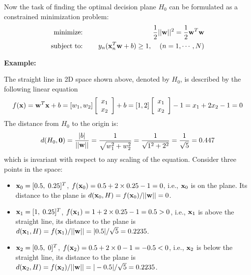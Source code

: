 \documentclass{article}
\begin{document}
Now the task of finding the optimal decision plane $H_0$ can be 
formulated as a constrained minimization problem:
\begin{eqnarray}
  \mbox{minimize:       } \;\;\;& &
  \frac{1}{2}||{\bf w}||^2 =\frac{1}{2}{\bf w}^T {\bf w}  \nonumber \\
  \mbox{subject to:     } \;\;\; & & 
  y_n ({\bf x}_n^T {\bf w}+b) \ge 1,\;\;\;\;(n=1,\cdots,N)
  \label{SVMprimal}
\end{eqnarray}


{\bf Example:}


The straight line in 2D space shown above, denoted by $H_0$, 
is described by the following linear equation 
\begin{equation}
  f({\bf x})={\bf w}^T{\bf x}+b=[w_1,w_2]
  \left[ \begin{array}{c} x_1 \\ x_2 \end{array} \right]+b
  =[1, 2]\left[ \begin{array}{c} x_1 \\ x_2 \end{array} \right]-1
  =x_1+2x_2-1=0 
\end{equation}
The distance from $H_0$ to the origin is:
\begin{equation}
  d(H_0,{\bf 0})=\frac{|b|}{||{\bf w}||}=\frac{1}{\sqrt{w_1^2+w_2^2}}
  =\frac{1}{\sqrt{1^2+2^2}}=\frac{1}{\sqrt{5}}=0.447
\end{equation}
which is invariant with respect to any scaling of the equation. 
Consider three points in the space:
\begin{itemize}
\item ${\bf x}_0=[0.5,\;0.25]^T$, $f({\bf x}_0)=0.5+2\times 0.25-1=0$, 
  i.e., ${\bf x}_0$ is on the plane. Its distance to the plane is
  $d({\bf x}_0,H)=f({\bf x}_0)/||{\bf w}||=0$.
\item ${\bf x}_1=[1,\;0.25]^T$, $f({\bf x}_1)=1+2\times 0.25-1=0.5>0$, 
  i.e., ${\bf x}_1$ is above the straight line, its distance to the plane
  is $d({\bf x}_1,H)=f({\bf x}_1)/||{\bf w}||=|0.5|/\sqrt{5}=0.2235$.
\item ${\bf x}_2=[0.5,\;0]^T$, $f({\bf x}_2)=0.5+2\times 0-1=-0.5<0$, i.e., 
  ${\bf x}_2$ is below the straight line, its distance to the plane is
  $d({\bf x}_2,H)=f({\bf x}_2)/||{\bf w}||=|-0.5|/\sqrt{5}=0.2235$.
\end{itemize}
\end{document}
